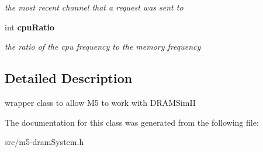 \begin{CompactItemize}
\begin{CompactList}\small\item\em the most recent channel that a request was sent to \item\end{CompactList}\item 
int {\bf cpuRatio}\label{class_m5dram_system_2fbee1e022242e218e235df762bcd82a}

\begin{CompactList}\small\item\em the ratio of the cpu frequency to the memory frequency \item\end{CompactList}\end{CompactItemize}


\subsection{Detailed Description}
wrapper class to allow M5 to work with DRAMSimII 

The documentation for this class was generated from the following file:\begin{CompactItemize}
\item 
src/m5-dramSystem.h\end{CompactItemize}
